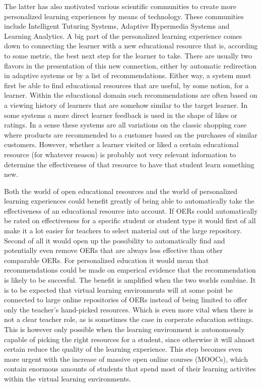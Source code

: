 \documentclass{book}
\begin{document}
The latter has also motivated various scientific communities to create more personalized learning experiences by means of technology. These communities include Intelligent Tuturing Systems, Adaptive Hypermedia Systems and Learning Analytics. A big part of the personalized learning experience comes down to connecting the learner with a new educational resource that is, according to some metric, the best next step for the learner to take. There are usually two flavors in the presentation of this new connection, either by automatic redirection in adaptive systems or by a list of recommendations. Either way, a system must first be able to find educational resources that are useful, by some notion, for a learner. Within the educational domain such recommendations are often based on a viewing history of learners that are somehow similar to the target learner. In some systems a more direct learner feedback is used in the shape of likes or ratings. In a sense these systems are all variations on the classic shopping case where products are recommended to a customer based on the purchases of similar customers. However, whether a learner visited or liked a certain educational resource (for whatever reason) is probably not very relevant information to determine the effectiveness of that resource to have that student learn something new.

Both the world of open educational resources and the world of personalized learning experiences could benefit greatly of being able to automatically take the effectiveness of an educational resource into account. If OERs could automatically be rated on effectiveness for a specific student or student type it would first of all make it a lot easier for teachers to select material out of the large repository. Second of all it would open up the possibility to automatically find and potentially even remove OERs that are always less effective than other comparable OERs. For personalized education it would mean that recommendations could be made on emperical evidence that the recommendation is likely to be succesful. The benefit is amplified when the two worlds combine. It is to be expected that virtual learning environments will at some point be connected to large online repositories of OERs instead of being limited to offer only the teacher’s hand-picked resources. Which is even more vital when there is not a clear teacher role, as is sometimes the case in corperate education settings. This is however only possible when the learning environment is autonomously capable of picking the right resources for a student, since otherwise it will almost certain reduce the quality of the learning experience. This step becomes even more urgent with the increase of massive open online courses (MOOCs), which contain enormous amounts of students that spend most of their learning activites within the virtual learning environments.
\end{document}
